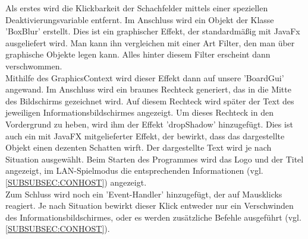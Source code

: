\documentclass[12pt,a4paper]{article}
\begin{document}
Als erstes wird die Klickbarkeit der Schachfelder mittels einer speziellen Deaktivierungsvariable entfernt. Im Anschluss wird ein Objekt der Klasse 'BoxBlur' erstellt. Dies ist ein graphischer Effekt, der standardmäßig mit JavaFx ausgeliefert wird. Man kann ihn vergleichen mit einer Art Filter, den man über graphische Objekte legen kann. Alles hinter diesem Filter erscheint dann verschwommen. \\
Mithilfe des GraphicsContext wird dieser Effekt dann auf unsere 'BoardGui' angewand. 
Im Anschluss wird ein braunes Rechteck generiert, das in die Mitte des Bildschirms gezeichnet wird. Auf diesem Rechteck wird später der Text des jeweiligen Informationsbildschirmes angezeigt. Um dieses Rechteck in den Vordergrund zu heben, wird ihm der Effekt 'dropShadow' hinzugefügt. Dies ist auch ein mit JavaFX mitgelieferter Effekt, der bewirkt, dass das dargestellte Objekt einen dezenten Schatten wirft.
Der dargestellte Text wird je nach Situation ausgewählt. Beim Starten des Programmes wird das Logo und der Titel angezeigt, im LAN-Spielmodus die entsprechenden Informationen (vgl. \ref{SUBSUBSEC:CONHOST}) angezeigt. \\
Zum Schluss wird noch ein 'Event-Handler' hinzugefügt, der auf Mausklicks reagiert. Je nach Situation bewirkt dieser Klick entweder nur ein Verschwinden des Informationsbildschirmes, oder es werden zusätzliche Befehle ausgeführt (vgl. \ref{SUBSUBSEC:CONHOST}). \\
\end{document}
